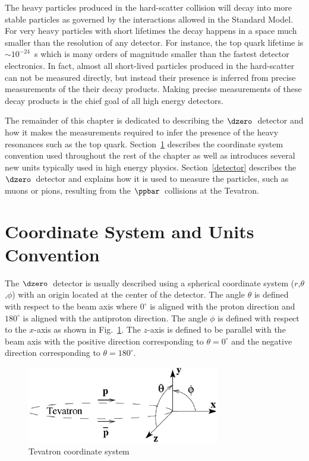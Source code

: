 The heavy particles produced in the hard-scatter collision will decay into more stable particles as governed by the interactions allowed in the Standard Model. For very heavy particles with short lifetimes the decay happens in a space much smaller than the resolution of any detector. For instance, the top quark lifetime is $\sim10^{-24}$~s which is many orders of magnitude smaller than the fastest detector electronics. In fact, almost all short-lived particles produced in the hard-scatter can not be measured directly, but instead their presence is inferred from precise measurements of the their decay products. Making precise measurements of these decay products is the chief goal of all high energy detectors.

The remainder of this chapter is dedicated to describing the $\dzero$~detector and how it makes the measurements required to infer the presence of the heavy resonances such as the top quark. Section~\ref{coordinate} describes the coordinate system convention used throughout the rest of the chapter as well as introduces several new units typically used in high energy physics. Section~\ref{detector} describes the $\dzero$~detector and explains how it is used to measure the particles, such as muons or pions, resulting from the $\ppbar$~collisions at the Tevatron.

\section{Coordinate System and Units Convention}
\label{coordinate}

The $\dzero$~detector is usually described using a spherical coordinate system ($r$,$\theta$,$\phi$) with an origin located at the center of the detector. The angle $\theta$ is defined with respect to the beam axis where $0^{\circ}$ is aligned with the proton direction and $180^{\circ}$ is aligned with the antiproton direction. The angle $\phi$ is defined with respect to the $x$-axis as shown in Fig.~\ref{coordinate-eps}. The $z$-axis is defined to be parallel with the beam axis with the positive direction corresponding to $\theta = 0^{\circ}$ and the negative direction corresponding to $\theta = 180^{\circ}$.

\begin{figure}[!h!tbp]
\begin{center}
\includegraphics[width=0.75\textwidth]{eps/Tevatron/Coordinate.eps}
\end{center}
\vspace{-0.1in}
\caption{Tevatron coordinate system}
\label{coordinate-eps}
\end{figure}

